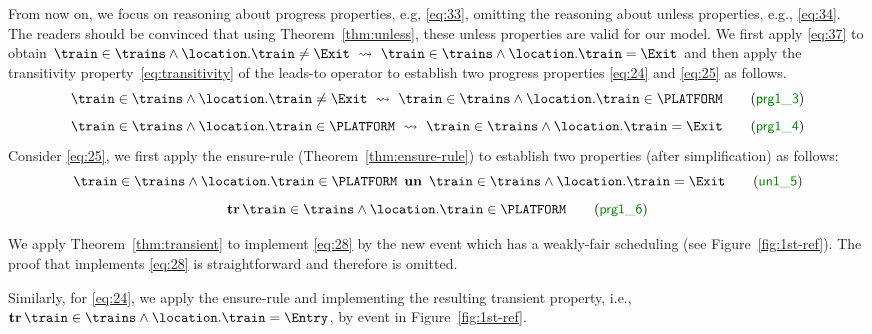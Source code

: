 From now on, we focus on reasoning about progress properties, e.g,
\ref{eq:33}, omitting the reasoning about unless properties, e.g.,
\ref{eq:34}.  The readers should be convinced that using
Theorem~\ref{thm:unless}, these unless properties are valid for our
model.  We first apply \eqref{eq:37} to obtain $\train \in \trains
\land \location.\train \neq \Exit ~\leadsto~ \train \in \trains \land
\location.\train = \Exit$ and then apply the transitivity
property~\eqref{eq:transitivity} of the leads-to operator to establish
two progress properties \ref{eq:24} and \ref{eq:25} as follows.
\begin{equation}
  \label{eq:24}
  \train \in \trains \land \location.\train
  \neq \Exit ~\leadsto~ \train \in
  \trains \land \location.\train \in \PLATFORM
  \tag{\Binv{prg1\_3}}
\end{equation}
\begin{equation}
  \label{eq:25}
  \train \in \trains \land \location.\train
  \in \PLATFORM ~\leadsto~ \train \in
  \trains \land \location.\train = \Exit
  \tag{\Binv{prg1\_4}}
\end{equation}
Consider \ref{eq:25}, we first apply the ensure-rule
(Theorem~\ref{thm:ensure-rule}) to establish two properties (after
simplification) as follows:
\begin{equation}
  \label{eq:27}
  \train \in \trains \land \location.\train \in \PLATFORM ~\un~
  \train \in \trains \land \location.\train = \Exit
  \tag{\Binv{un1\_5}}
\end{equation}
\begin{equation}
  \label{eq:28}
  \tr \train \in \trains \land \location.\train \in
    \PLATFORM
  \tag{\Binv{prg1\_6}}
\end{equation}

We apply Theorem~\ref{thm:transient} to implement \ref{eq:28} by the
new event \moveout which has a weakly-fair scheduling (see
Figure~\ref{fig:1st-ref}).
The proof that \moveout implements \ref{eq:28} is straightforward and
therefore is omitted.

Similarly, for \ref{eq:24}, we apply the ensure-rule and implementing
the resulting transient property, i.e., $\tr \train \in \trains \land
\location.\train = \Entry$, by event \movein in Figure~\ref{fig:1st-ref}.

